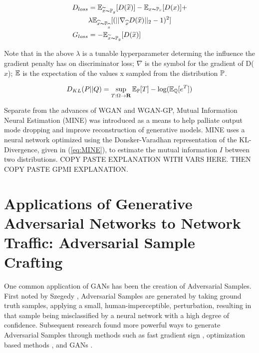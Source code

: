 \begin{align}
	D_{loss} &=  \E_{\widetilde{x} \thicksim \P_g}[D(\widetilde{x})] - \E_{x \thicksim \P_r}[D(x)] + \label{eq:WGAN-GP1} \\
	& \lambda \E_{\widehat{x} \thicksim \P_{\widehat{x}}}[(||\nabla_{\widehat{x}} D(\widehat{x})||_2 -1)^2] \label{eq:WGAN-GP2}\\
	G_{loss} &=  -\E_{\widetilde{x} \thicksim \P_g}[D(\widetilde{x})] \label{eq:WGAN-GP3}
\end{align}

Note that in the above $\lambda$ is a tunable hyperparameter determing the influence the gradient penalty has on discriminator loss; $\nabla$ is the symbol for the gradient of D($\widehat{x}$); $\E$ is the expectation of the values x sampled from the distribution $\P$.

\begin{equation}
	D_{KL}(P||Q) = \sup\limits_{T:\Omega \rightarrow \Reals} \E_\P[T] - \log(\E_\Q[e^T])
	\label{eq:MINE}
\end{equation}

Separate from the advances of WGAN and WGAN-GP, Mutual Information Neural Estimation (MINE) \cite{Belghazi2018} was introduced as a means to help palliate output mode dropping and improve reconstruction of generative models. MINE uses a neural network optimized using the Donsker-Varadhan representation of the KL-Divergence, given in (\ref{eq:MINE}), to estimate the mutual information $I$ between two distributions. COPY PASTE EXPLANATION WITH VARS HERE. THEN COPY PASTE GPMI EXPLANATION.

\section{Applications of Generative Adversarial Networks to Network Traffic: Adversarial Sample Crafting}

One common application of GANs has been the creation of Adversarial Samples. First noted by Szegedy \etal \cite{Szegedy2013}, Adversarial Samples are generated by taking ground truth samples, applying a small, human-imperceptible, perturbation, resulting in that sample being misclassified by a neural network with a high degree of confidence. Subsequent research found more powerful ways to generate Adversarial Samples through methods such as fast gradient sign \cite{Goodfellow2015}, optimization based methods \cite{Carlini2017, Liu2017, Eykholt2018}, and GANs \cite{Xiao2018, Rigaki2018, Lin2018, Hu2017, Anderson2017}. 

